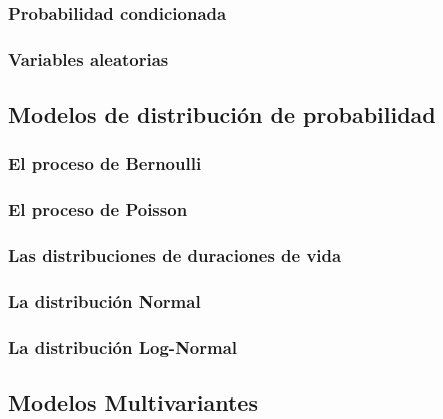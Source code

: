 \subsubsection{Probabilidad condicionada}
\subsubsection{Variables aleatorias}
\subsection{Modelos de distribución de probabilidad}
\subsubsection{El proceso de Bernoulli}
\subsubsection{El proceso de Poisson}
\subsubsection{Las distribuciones de duraciones de vida}
\subsubsection{La distribución Normal}
\subsubsection{La distribución Log-Normal}
\subsection{Modelos Multivariantes}
